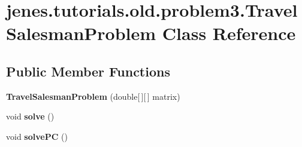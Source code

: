 \hypertarget{classjenes_1_1tutorials_1_1old_1_1problem3_1_1_travel_salesman_problem}{
\section{jenes.tutorials.old.problem3.TravelSalesmanProblem Class Reference}
\label{classjenes_1_1tutorials_1_1old_1_1problem3_1_1_travel_salesman_problem}
}
\subsection*{Public Member Functions}
\begin{CompactItemize}
\item 
\hypertarget{classjenes_1_1tutorials_1_1old_1_1problem3_1_1_travel_salesman_problem_e81620be1ad206e8226f0c0dc913ab44}{
\textbf{TravelSalesmanProblem} (double\mbox{[}$\,$\mbox{]}\mbox{[}$\,$\mbox{]} matrix)}
\label{classjenes_1_1tutorials_1_1old_1_1problem3_1_1_travel_salesman_problem_e81620be1ad206e8226f0c0dc913ab44}

\item 
\hypertarget{classjenes_1_1tutorials_1_1old_1_1problem3_1_1_travel_salesman_problem_c5e087aada09768a49ab10f7178e938f}{
void \textbf{solve} ()}
\label{classjenes_1_1tutorials_1_1old_1_1problem3_1_1_travel_salesman_problem_c5e087aada09768a49ab10f7178e938f}

\item 
\hypertarget{classjenes_1_1tutorials_1_1old_1_1problem3_1_1_travel_salesman_problem_94afc262b0ac0e840be70087dd6e11f3}{
void \textbf{solvePC} ()}
\label{classjenes_1_1tutorials_1_1old_1_1problem3_1_1_travel_salesman_problem_94afc262b0ac0e840be70087dd6e11f3}

\end{CompactItemize}
